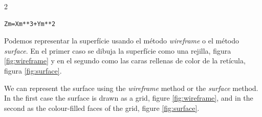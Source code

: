 \begin{paracol} {2}
\begin{verbatim}
Zm=Xm**3+Ym**2
\end{verbatim}

\switchcolumn
Podemos representar la superfície usando el método \textit{wireframe} o el método \textit{surface}. En el primer caso se dibuja la superfície como una rejilla, figura \ref{fig:wireframe} y en el segundo como las caras rellenas de color de la retícula, figura \ref{fig:surface}.

\switchcolumn

We can represent the surface using the \textit{wireframe} method or the \textit{surface} method. In the first case the surface is drawn as a grid, figure \ref{fig:wireframe}, and in the second as the colour-filled faces of the grid, figure \ref{fig:surface}.

\end{paracol}

\begin{figure}[H]
\centering
{} %
{}\\
\end{figure}

